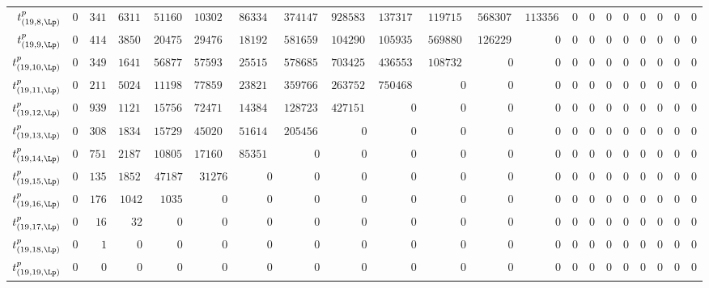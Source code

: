 \begin{tabular}{r|rrrrrrrrrrrrrrrrrrrr}
  $t^{p}_{(19,8,\Lp)}$ & $0$ & $341653$ & $631110176$ & $51160294755$ & $1030241143424$ & $8633428213455$ & $37414730546142$ & $92858358615057$ & $137317626067224$ & $119715431156496$ & $56830794390000$ & $11335644888480$ & $0$ & $0$ & $0$ & $0$ & $0$ & $0$ & $0$ & $0$ \\
  $t^{p}_{(19,9,\Lp)}$ & $0$ & $414116$ & $385020920$ & $20475222225$ & $294760012828$ & $1819208773455$ & $5816592667794$ & $10429068363329$ & $10593522202584$ & $5698805949495$ & $1262299126950$ & $0$ & $0$ & $0$ & $0$ & $0$ & $0$ & $0$ & $0$ & $0$ \\
  $t^{p}_{(19,10,\Lp)}$ & $0$ & $349703$ & $164188448$ & $5687776923$ & $57593296700$ & $255151539875$ & $578685898578$ & $703425198707$ & $436553991256$ & $108732776841$ & $0$ & $0$ & $0$ & $0$ & $0$ & $0$ & $0$ & $0$ & $0$ & $0$ \\
  $t^{p}_{(19,11,\Lp)}$ & $0$ & $211891$ & $50242458$ & $1119895071$ & $7785906316$ & $23821893150$ & $35976620028$ & $26375281674$ & $7504680912$ & $0$ & $0$ & $0$ & $0$ & $0$ & $0$ & $0$ & $0$ & $0$ & $0$ & $0$ \\
  $t^{p}_{(19,12,\Lp)}$ & $0$ & $93975$ & $11211070$ & $157568952$ & $724718440$ & $1438432380$ & $1287239856$ & $427151802$ & $0$ & $0$ & $0$ & $0$ & $0$ & $0$ & $0$ & $0$ & $0$ & $0$ & $0$ & $0$ \\
  $t^{p}_{(19,13,\Lp)}$ & $0$ & $30846$ & $1834820$ & $15729672$ & $45020864$ & $51614165$ & $20545662$ & $0$ & $0$ & $0$ & $0$ & $0$ & $0$ & $0$ & $0$ & $0$ & $0$ & $0$ & $0$ & $0$ \\
  $t^{p}_{(19,14,\Lp)}$ & $0$ & $7516$ & $218790$ & $1080537$ & $1716012$ & $853515$ & $0$ & $0$ & $0$ & $0$ & $0$ & $0$ & $0$ & $0$ & $0$ & $0$ & $0$ & $0$ & $0$ & $0$ \\
  $t^{p}_{(19,15,\Lp)}$ & $0$ & $1350$ & $18520$ & $47187$ & $31276$ & $0$ & $0$ & $0$ & $0$ & $0$ & $0$ & $0$ & $0$ & $0$ & $0$ & $0$ & $0$ & $0$ & $0$ & $0$ \\
  $t^{p}_{(19,16,\Lp)}$ & $0$ & $176$ & $1042$ & $1035$ & $0$ & $0$ & $0$ & $0$ & $0$ & $0$ & $0$ & $0$ & $0$ & $0$ & $0$ & $0$ & $0$ & $0$ & $0$ & $0$ \\
  $t^{p}_{(19,17,\Lp)}$ & $0$ & $16$ & $32$ & $0$ & $0$ & $0$ & $0$ & $0$ & $0$ & $0$ & $0$ & $0$ & $0$ & $0$ & $0$ & $0$ & $0$ & $0$ & $0$ & $0$ \\
  $t^{p}_{(19,18,\Lp)}$ & $0$ & $1$ & $0$ & $0$ & $0$ & $0$ & $0$ & $0$ & $0$ & $0$ & $0$ & $0$ & $0$ & $0$ & $0$ & $0$ & $0$ & $0$ & $0$ & $0$ \\
  $t^{p}_{(19,19,\Lp)}$ & $0$ & $0$ & $0$ & $0$ & $0$ & $0$ & $0$ & $0$ & $0$ & $0$ & $0$ & $0$ & $0$ & $0$ & $0$ & $0$ & $0$ & $0$ & $0$ & $0$ \\
\end{tabular}
